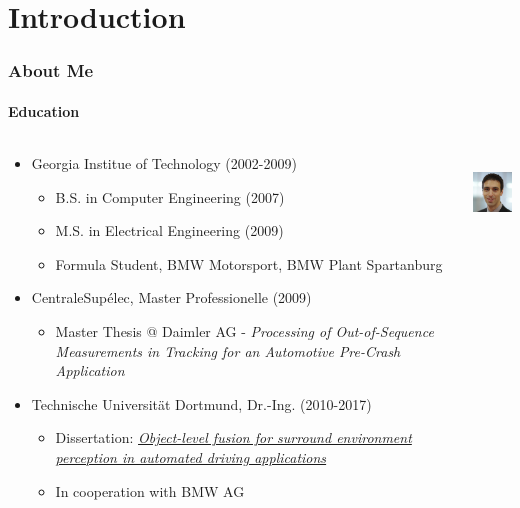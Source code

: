 \section{Introduction}

\begin{frame}[t]
\frametitle{About Me}
\framesubtitle{Education}
\begin{columns}[T]
    \begin{column}{.80\textwidth}
    \begin{itemize}
        \item Georgia Institue of Technology (2002-2009)
        \begin{itemize}
            \item B.S. in Computer Engineering (2007)
            \item M.S. in Electrical Engineering (2009)
            \item Formula Student, BMW Motorsport, BMW Plant Spartanburg
        \end{itemize}
        \item CentraleSup\'{e}lec, Master Professionelle (2009)
        \begin{itemize}
            \item Master Thesis @ Daimler AG - \emph{Processing of Out-of-Sequence
                Measurements in Tracking for an Automotive Pre-Crash Application}
        \end{itemize}
        \item Technische Universit\"{a}t Dortmund, Dr.-Ing. (2010-2017)
        \begin{itemize}
            \item Dissertation: \emph{\href{https://eldorado.tu-dortmund.de/handle/2003/36011}{Object-level fusion for surround environment perception in automated driving applications}}
            \item In cooperation with BMW AG
        \end{itemize}
    \end{itemize}
    \end{column}
    \begin{column}{.20\textwidth}
    \centering
    \includegraphics[height=2.0cm]{images/michael-aeberhard-profile.jpg} \\
    \end{column}
\end{columns}
\end{frame}

